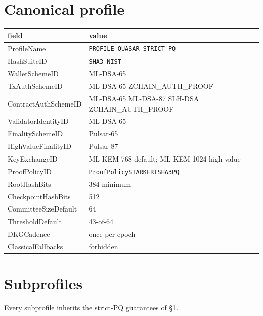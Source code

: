 \documentclass[11pt,a4paper]{article}
\begin{document}
\section{Canonical profile}
\label{sec:profile-table}

\begin{center}\small
\begin{tabular}{l l}
\toprule
field & value \\
\midrule
ProfileName              & \texttt{PROFILE\_QUASAR\_STRICT\_PQ} \\
HashSuiteID              & \texttt{SHA3\_NIST} \\
WalletSchemeID           & ML-DSA-65 \\
TxAuthSchemeID           & ML-DSA-65 \textbar{} ZCHAIN\_AUTH\_PROOF \\
ContractAuthSchemeID     & ML-DSA-65 \textbar{} ML-DSA-87 \textbar{} SLH-DSA \textbar{} ZCHAIN\_AUTH\_PROOF \\
ValidatorIdentityID      & ML-DSA-65 \\
FinalitySchemeID         & Pulsar-65 \\
HighValueFinalityID      & Pulsar-87 \\
KeyExchangeID            & ML-KEM-768 default; ML-KEM-1024 high-value \\
ProofPolicyID            & \texttt{ProofPolicySTARKFRISHA3PQ} \\
RootHashBits             & 384 minimum \\
CheckpointHashBits       & 512 \\
CommitteeSizeDefault     & 64 \\
ThresholdDefault         & 43-of-64 \\
DKGCadence               & once per epoch \\
ClassicalFallbacks       & forbidden \\
\bottomrule
\end{tabular}
\end{center}

\section{Subprofiles}
\label{sec:subprofiles}

Every subprofile inherits the strict-PQ guarantees of
\S\ref{sec:profile-table}.
\end{document}
